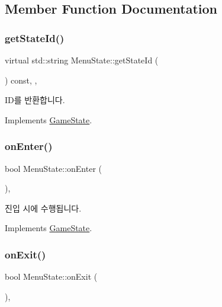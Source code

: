 \subsection{Member Function Documentation}
\mbox{\label{class_menu_state_a96131ebc632546458ccf8034f87a692b}} 
\subsubsection{\texorpdfstring{getStateId()}{getStateId()}}
{\footnotesize\ttfamily virtual std\+::string Menu\+State\+::get\+State\+Id (\begin{DoxyParamCaption}{ }\end{DoxyParamCaption}) const\hspace{0.3cm}{\ttfamily [inline]}, {\ttfamily [override]}, {\ttfamily [virtual]}}

I\+D를 반환합니다. 

Implements \mbox{\hyperlink{class_game_state_a79e985882263b3e2642ad002c03acaa9}{Game\+State}}.

\mbox{\label{class_menu_state_a1c825d87d75a552440e0fc54a4428359}} 
\subsubsection{\texorpdfstring{onEnter()}{onEnter()}}
{\footnotesize\ttfamily bool Menu\+State\+::on\+Enter (\begin{DoxyParamCaption}{ }\end{DoxyParamCaption})\hspace{0.3cm}{\ttfamily [override]}, {\ttfamily [virtual]}}

진입 시에 수행됩니다. 

Implements \mbox{\hyperlink{class_game_state_ac9dd3f269dda278d57d9a1e3e27461da}{Game\+State}}.

\mbox{\label{class_menu_state_aae03dc2a5d860a3a1a2ea946cd3309a5}} 
\subsubsection{\texorpdfstring{onExit()}{onExit()}}
{\footnotesize\ttfamily bool Menu\+State\+::on\+Exit (\begin{DoxyParamCaption}{ }\end{DoxyParamCaption})\hspace{0.3cm}{\ttfamily [override]}, {\ttfamily [virtual]}}

